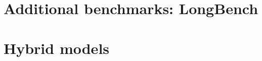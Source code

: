 \documentclass{article}
\begin{document}


\appendix
\section{Additional benchmarks: LongBench}
\label{app:longbench}

\section{Hybrid models}
\label{app:hybrid}
\end{document}
